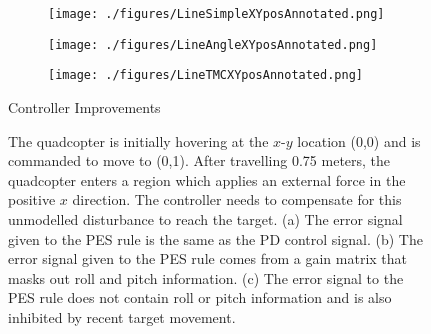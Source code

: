 \documentclass[letterpaper, 10 pt, conference]{ieeeconf}  %
\begin{document}
\begin{figure}
\centering
\begin{subfigure}[t]{0.15\textwidth}
\texttt{[image: ./figures/LineSimpleXYposAnnotated.png]}
\caption{}
\label{fig:ImprovementComparisonA}
\end{subfigure}
\begin{subfigure}[t]{0.15\textwidth}
\texttt{[image: ./figures/LineAngleXYposAnnotated.png]}
\caption{}
\label{fig:ImprovementComparisonB}
\end{subfigure}
\begin{subfigure}[t]{0.15\textwidth}
\texttt{[image: ./figures/LineTMCXYposAnnotated.png]}
\caption{}
\label{fig:ImprovementComparisonC}
\end{subfigure}
\caption{Controller Improvements}
\label{fig:ImprovementComparison}
\captionsetup{singlelinecheck=off,font=footnotesize}
\caption*{The quadcopter is initially hovering at the $x$-$y$ location (0,0) and is commanded to move to (0,1). After travelling 0.75 meters, the quadcopter enters a region which applies an external force in the positive $x$ direction. The controller needs to compensate for this unmodelled disturbance to reach the target. (a) The error signal given to the PES rule is the same as the PD control signal. (b) The error signal given to the PES rule comes from a gain matrix that masks out roll and pitch information. (c) The error signal to the PES rule does not contain roll or pitch information and is also inhibited by recent target movement.}
\end{figure}
\end{document}
